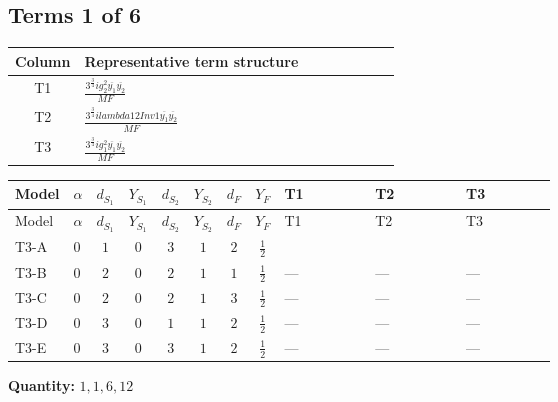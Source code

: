 \documentclass[8pt]{article}
\begin{document}
\begin{landscape}
\subsection*{Terms 1 of 6}
\begin{center}
\begin{tabular}{@{}c >{\raggedright\arraybackslash}p{0.82\linewidth}@{}}
\toprule
Column & Representative term structure \\
\midrule
T1 & \(\displaystyle \frac{3^{\frac{3}{4}} i g_{2}^{2} \overline{y_{1}} \overline{y_{2}}}{MF}\) \\
\midrule
T2 & \(\displaystyle \frac{3^{\frac{3}{4}} i lambda12Inv1 \overline{y_{1}} \overline{y_{2}}}{MF}\) \\
\midrule
T3 & \(\displaystyle \frac{3^{\frac{3}{4}} i g_{1}^{2} \overline{y_{1}} \overline{y_{2}}}{MF}\) \\
\midrule
\bottomrule
\end{tabular}
\end{center}
\smallskip
\tiny
\begin{longtable}{@{}llcccccc >{\raggedright\arraybackslash}p{0.21\linewidth} >{\raggedright\arraybackslash}p{0.21\linewidth} >{\raggedright\arraybackslash}p{0.21\linewidth}@{}}
\toprule
Model & $\alpha$ & $d_{S_1}$ & $Y_{S_1}$ & $d_{S_2}$ & $Y_{S_2}$ & $d_F$ & $Y_F$ & T1 & T2 & T3 \\
\midrule
\endfirsthead
\toprule
Model & $\alpha$ & $d_{S_1}$ & $Y_{S_1}$ & $d_{S_2}$ & $Y_{S_2}$ & $d_F$ & $Y_F$ & T1 & T2 & T3 \\
\midrule
\endhead
T3-A & $0$ & $1$ & $0$ & $3$ & $1$ & $2$ & $\frac{1}{2}$ & \scriptsize\adjustbox{max width=\linewidth}{$\begin{gathered} - \frac{17 \cdot 3^{\frac{3}{4}} i g_{2}^{2} \overline{y_{1}} \overline{y_{2}}}{24 MF}\end{gathered}$} & \scriptsize\adjustbox{max width=\linewidth}{$\begin{gathered} - \frac{3^{\frac{3}{4}} i lambda12Inv1 \overline{y_{1}} \overline{y_{2}}}{6 MF}\end{gathered}$} & \scriptsize\adjustbox{max width=\linewidth}{$\begin{gathered} - \frac{3^{\frac{3}{4}} i g_{1}^{2} \overline{y_{1}} \overline{y_{2}}}{8 MF}\end{gathered}$} \\
\midrule
T3-B & $0$ & $2$ & $0$ & $2$ & $1$ & $1$ & $\frac{1}{2}$ & --- & --- & --- \\
\midrule
T3-C & $0$ & $2$ & $0$ & $2$ & $1$ & $3$ & $\frac{1}{2}$ & --- & --- & --- \\
\midrule
T3-D & $0$ & $3$ & $0$ & $1$ & $1$ & $2$ & $\frac{1}{2}$ & --- & --- & --- \\
\midrule
T3-E & $0$ & $3$ & $0$ & $3$ & $1$ & $2$ & $\frac{1}{2}$ & --- & --- & --- \\
\midrule
\bottomrule
\end{longtable}
\clearpage
\noindent\textbf{Quantity: }$\mathrm{1,1,6,12}$\par\smallskip

\end{landscape}
\end{document}

